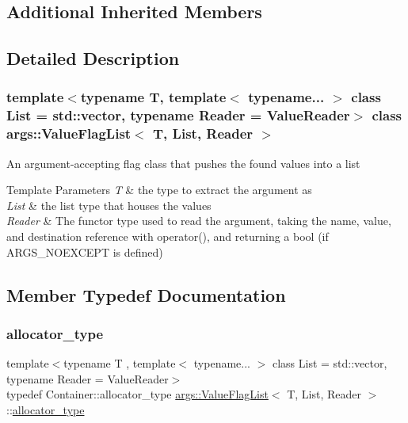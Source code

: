 \subsection*{Additional Inherited Members}


\subsection{Detailed Description}
\subsubsection*{template$<$typename T, template$<$ typename... $>$ class List = std\+::vector, typename Reader = Value\+Reader$>$\newline
class args\+::\+Value\+Flag\+List$<$ T, List, Reader $>$}

An argument-\/accepting flag class that pushes the found values into a list


\begin{DoxyTemplParams}{Template Parameters}
{\em T} & the type to extract the argument as \\
\hline
{\em List} & the list type that houses the values \\
\hline
{\em Reader} & The functor type used to read the argument, taking the name, value, and destination reference with operator(), and returning a bool (if A\+R\+G\+S\+\_\+\+N\+O\+E\+X\+C\+E\+PT is defined) \\
\hline
\end{DoxyTemplParams}


\subsection{Member Typedef Documentation}
\mbox{\label{classargs_1_1_value_flag_list_a3031e51145bbc8cc712ac08eaff4a5bc}} 
\subsubsection{\texorpdfstring{allocator\+\_\+type}{allocator\_type}}
{\footnotesize\ttfamily template$<$typename T , template$<$ typename... $>$ class List = std\+::vector, typename Reader  = Value\+Reader$>$ \\
typedef Container\+::allocator\+\_\+type \hyperlink{classargs_1_1_value_flag_list}{args\+::\+Value\+Flag\+List}$<$ T, List, Reader $>$\+::\hyperlink{classargs_1_1_value_flag_list_a3031e51145bbc8cc712ac08eaff4a5bc}{allocator\+\_\+type}}

